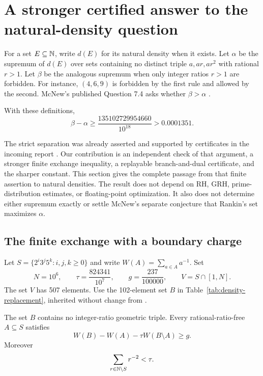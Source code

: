 \section{A stronger certified answer to the natural-density question}
\label{sec:density}

For a set $E\subseteq\mathbb N$, write $d(E)$ for its natural density when it exists.
Let $\alpha$ be the supremum of $d(E)$ over sets containing no distinct triple
$a,ar,ar^2$ with rational $r>1$. Let $\beta$ be the analogous supremum when only
integer ratios $r>1$ are forbidden. For instance, $(4,6,9)$ is forbidden by the
first rule and allowed by the second. McNew's published Question 7.4 asks whether
$\beta>\alpha$ \cite{McNew}.

\begin{theorem}\label{thm:density-gap}
With these definitions,
\[
 \boxed{\quad \beta-\alpha\ge
 \frac{135102729954660}{10^{18}}>0.0001351.\quad}
\]
\end{theorem}

The strict separation was already asserted and supported by certificates in
the incoming report \cite{priorDensity}. Our contribution is an independent
check of that argument, a stronger finite exchange inequality, a replayable
branch-and-dual certificate, and the sharper constant. This section gives the
complete passage from that finite assertion to natural densities. The result
does not depend on RH, GRH, prime-distribution estimates, or floating-point
optimization. It also does not determine either supremum exactly or settle
McNew's separate conjecture that Rankin's set maximizes $\alpha$.

\subsection{The finite exchange with a boundary charge}
Let $S=\{2^i3^j5^k:i,j,k\ge0\}$ and write $W(A)=\sum_{a\in A}a^{-1}$.
Set
\[
 N=10^6,\qquad \tau=\frac{824341}{10^7},\qquad
 g=\frac{237}{100000},\qquad V=S\cap[1,N].
\]
The set $V$ has 507 elements. Use the 102-element set $B$ in
Table~\ref{tab:density-replacement}, inherited without change from
\cite{priorDensity}.

\begin{lemma}\label{lem:density-exchange}
The set $B$ contains no integer-ratio geometric triple. Every
rational-ratio-free $A\subseteq S$ satisfies
\begin{equation}\label{eq:density-exchange}
 W(B)-W(A)-\tau W(B\setminus A)\ge g.
\end{equation}
Moreover
\[
 \sum_{r\in\mathbb N\setminus S}r^{-2}<\tau.
\]
\end{lemma}

